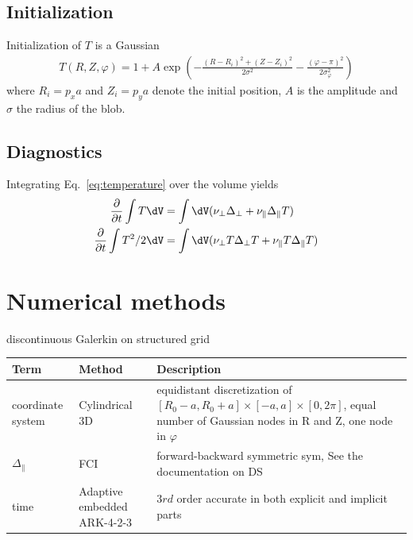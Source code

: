 \subsection{Initialization}
Initialization of $T$ is a Gaussian
\begin{align} \label{eq:initial}
  T(R,Z,\varphi) = 1 + A\exp\left(
      -\frac{(R-R_i)^2 + (Z-Z_i)^2}{2\sigma^2} - \frac{(\varphi-\pi)^2}{2\sigma_\varphi^2}\right)
\end{align}
where $R_i = p_x a$ and $Z_i = p_y a$ denote the initial position, $A$ is the amplitude and $\sigma$ the
radius of the blob.
\subsection{Diagnostics}
Integrating Eq.~\eqref{eq:temperature} over the volume yields
\begin{align}
 \frac{\partial}{\partial t} \int T \dV &=
    \int \dV ( \nu_\perp \Delta_\perp + \nu_\parallel \Delta_\parallel T) \\
 \frac{\partial}{\partial t} \int T^2/2 \dV &=
    \int \dV ( \nu_\perp T\Delta_\perp T + \nu_\parallel T\Delta_\parallel T)
\label{}
\end{align}
\section{Numerical methods}
discontinuous Galerkin on structured grid
\begin{longtable}{ll>{\RaggedRight}p{7cm}}
\toprule
\rowcolor{gray!50}\textbf{Term} &  \textbf{Method} & \textbf{Description}  \\ \midrule
coordinate system & Cylindrical 3D & equidistant discretization of $[R_0-a,R_0+a] \times [-a,a] \times [0,2\pi]$, equal number of Gaussian nodes in R and Z, one node in $\varphi$ \\
$\Delta_\parallel$ & FCI & forward-backward symmetric sym, See the documentation on DS\\
time &  Adaptive embedded ARK-4-2-3 & $3rd$ order accurate in both
explicit and implicit parts\\
\bottomrule
\end{longtable}

